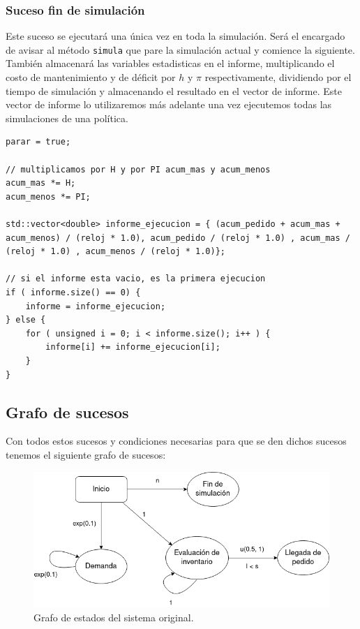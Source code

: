 \documentclass[12pt, spanish]{article}
\begin{document}
\subsubsection{Suceso fin de simulación}

Este suceso se ejecutará una única vez en toda la simulación. Será el encargado de avisar al método \texttt{simula} que pare la simulación actual y comience la siguiente. También almacenará las variables estadisticas en el informe, multiplicando el costo de mantenimiento y de déficit por $h$ y $\pi$ respectivamente, dividiendo por el tiempo de simulación y almacenando el resultado en el vector de informe. Este vector de informe lo utilizaremos más adelante una vez ejecutemos todas las simulaciones de una política.


\begin{lstlisting}
parar = true;

// multiplicamos por H y por PI acum_mas y acum_menos
acum_mas *= H;
acum_menos *= PI;

std::vector<double> informe_ejecucion = { (acum_pedido + acum_mas + acum_menos) / (reloj * 1.0), acum_pedido / (reloj * 1.0) , acum_mas / (reloj * 1.0) , acum_menos / (reloj * 1.0)};

// si el informe esta vacio, es la primera ejecucion
if ( informe.size() == 0) {
	informe = informe_ejecucion;
} else {
	for ( unsigned i = 0; i < informe.size(); i++ ) {
		informe[i] += informe_ejecucion[i];
	}
}
\end{lstlisting}



\subsection{Grafo de sucesos}

Con todos estos sucesos y condiciones necesarias para que se den dichos sucesos tenemos el siguiente grafo de sucesos:

\begin{figure}[H]
  \centering
   \includegraphics[width=\textwidth]{grafo_sucesos_original.png}
	\caption{Grafo de estados del sistema original.}
\end{figure}
\end{document}
